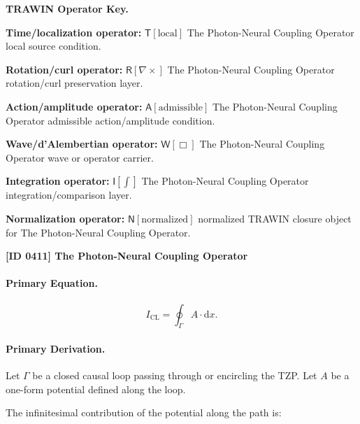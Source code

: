 \par\vspace{0.45\baselineskip}
\noindent\begin{minipage}[t]{\linewidth}
\begingroup
\small
\raggedright
\textbf{TRAWIN Operator Key.}\par
\noindent\textbf{Time/localization operator:} $\mathsf{T}\!\left[\mathrm{local}\right]$ The Photon-Neural Coupling Operator local source condition.\par
\noindent\textbf{Rotation/curl operator:} $\mathsf{R}\!\left[\nabla\times\right]$ The Photon-Neural Coupling Operator rotation/curl preservation layer.\par
\noindent\textbf{Action/amplitude operator:} $\mathsf{A}\!\left[\mathrm{admissible}\right]$ The Photon-Neural Coupling Operator admissible action/amplitude condition.\par
\noindent\textbf{Wave/d'Alembertian operator:} $\mathsf{W}\!\left[\Box\right]$ The Photon-Neural Coupling Operator wave or operator carrier.\par
\noindent\textbf{Integration operator:} $\mathsf{I}\!\left[\int\right]$ The Photon-Neural Coupling Operator integration/comparison layer.\par
\noindent\textbf{Normalization operator:} $\mathsf{N}\!\left[\mathrm{normalized}\right]$ normalized TRAWIN closure object for The Photon-Neural Coupling Operator.\par
\endgroup
\end{minipage}

\clearpage
\noindent\textbf{[ID 0411] The Photon-Neural Coupling Operator}\par
\vspace{0.35em}
\paragraph{Primary Equation.}
\begin{equation}
I_{\mathrm{CL}}
=
\oint_{\Gamma} A\cdot \mathrm{d}x .
\end{equation}

\paragraph{Primary Derivation.}
Let $\Gamma$ be a closed causal loop passing through or encircling the TZP.  
Let $A$ be a one-form potential defined along the loop.

The infinitesimal contribution of the potential along the path is:

